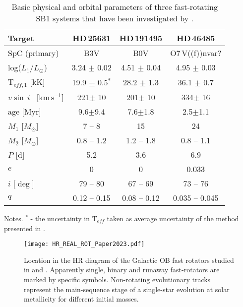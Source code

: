 \documentclass{aa}
\newcommand{\kms}{$\mathrm{km\,s^{-1}}$}
\newcommand{\vsini} {$v\sin\,i$}
\begin{document}
\begin{table}[!htbp]
{\small
\caption{Basic physical and orbital parameters of three
  fast-rotating SB1 systems that have been investigated by
  \citet{Naze_2023_rot}. }
\label{table:sb1_fast}
\begin{tabular}{l c c c}
\hline
\hline
Target                  & HD\,25631          &  HD\,191495      & HD\,46485 \\
\hline
SpC (primary)             &  B3V             &  B0V             &  O7\,V((f))nvar?  \\
log($L_{1}/L_{\odot}$)    &  3.24 $\pm$ 0.02 & 4.51 $\pm$ 0.04  & 4.95 $\pm$ 0.03 \\
T$_{eff,1}$ [kK]          & 19.9 $\pm$ 0.5$^{\ast}$  & 28.2 $\pm$ 1.3   & 36.1 $\pm$ 0.7  \\
\vsini~ [\kms]            &  221$\pm$ 10 &  201$\pm$ 10  & 334$\pm$ 16  \\
\hline
age  [Myr]       &  9.6$\pm$9.4  &  7.6$\pm$1.8  & 2.5$\pm$1.1   \\
$M_\mathrm{1}$   [$M_{\odot}$]  &  7 -- 8  &  15    & 24  \\
$M_\mathrm{2}$   [$M_{\odot}$] &  0.8 -- 1.2 & 1.2 -- 1.8 &  0.8 -- 1.1 \\
$P$  [d]  &  5.2  & 3.6   &  6.9 \\
$e$       & 0   &  0  &  0.033 \\
$i$ [$\deg$]  &  79 -- 80  &  67 -- 69  &  73 -- 76 \\
$q$ & 0.12 -- 0.15 & 0.08 -- 0.12 & 0.035 -- 0.045 \\
\hline
\end{tabular}
Notes. $^{\ast}$ - the uncertainty in T$_{eff}$ taken as average uncertainty of the method presented in \citet{Braganca_2012}.
}
\end{table}



\begin{figure}[!ht]
  \centering
  \texttt{[image: HR\_REAL\_ROT\_Paper2023.pdf]}
  \caption{Location in the HR diagram of the Galactic OB fast rotators studied in \citet{Britavskiy_2023} and \citet{Naze_2023_rot}. Apparently single, binary and runaway fast-rotators are marked by specific symbols. Non-rotating evolutionary tracks represent the main-sequence stage of a single-star evolution at solar metallicity for different initial masses.}
  \label{fig:hr_plot_paper2023}
\end{figure}
\end{document}

